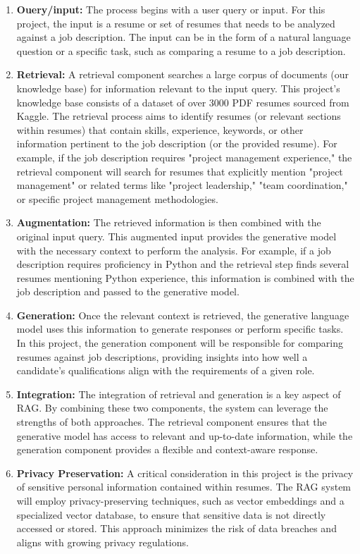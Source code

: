 \documentclass[12pt]{report}
\begin{document}
\begin{enumerate}
    \item \textbf{Ouery/input:} The process begins with a user query or input. For this project, the input is a resume or set of resumes that needs to be analyzed against a job description. The input can be in the form of a natural language question or a specific task, such as comparing a resume to a job description.
    \item \textbf{Retrieval:} A retrieval component searches a large corpus of documents (our knowledge base) for information relevant to the input query. This project’s knowledge base consists of a dataset of over 3000 PDF resumes sourced from Kaggle. The retrieval process aims to identify resumes (or relevant sections within resumes) that contain skills, experience, keywords, or other information pertinent to the job description (or the provided resume). For example, if the job description requires "project management experience," the retrieval component will search for resumes that explicitly mention "project management" or related terms like "project leadership," "team coordination," or specific project management methodologies.
    \item \textbf{Augmentation:} The retrieved information is then combined with the original input query. This augmented input provides the generative model with the necessary context to perform the analysis. For example, if a job description requires proficiency in Python and the retrieval step finds several resumes mentioning Python experience, this information is combined with the job description and passed to the generative model.
    \item \textbf{Generation:} Once the relevant context is retrieved, the generative language model uses this information to generate responses or perform specific tasks. In this project, the generation component will be responsible for comparing resumes against job descriptions, providing insights into how well a candidate's qualifications align with the requirements of a given role.
    \item \textbf{Integration:} The integration of retrieval and generation is a key aspect of RAG. By combining these two components, the system can leverage the strengths of both approaches. The retrieval component ensures that the generative model has access to relevant and up-to-date information, while the generation component provides a flexible and context-aware response. 
    \item \textbf{Privacy Preservation:} A critical consideration in this project is the privacy of sensitive personal information contained within resumes. The RAG system will employ privacy-preserving techniques, such as vector embeddings and a specialized vector database, to ensure that sensitive data is not directly accessed or stored. This approach minimizes the risk of data breaches and aligns with growing privacy regulations.
\end{enumerate}
\end{document}
